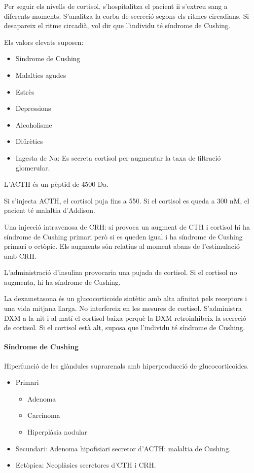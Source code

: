 Per seguir els nivells de cortisol, s'hospitalitza el pacient ii
s'extreu sang a diferents moments. S'analitza la corba de secreció
segons els ritmes circadians. Si desapareix el ritme circadià, vol dir
que l'individu té síndrome de Cushing.

Els valors elevats suposen:
\begin{itemize}
\item Síndrome de Cushing
\item Malalties agudes
\item Estrès
\item Depressions
\item Alcoholisme
\item Diürètics
\item Ingesta de Na: Es secreta cortisol per augmentar la taxa de
  filtració glomerular.
\end{itemize}

L'ACTH és un pèptid de 4500 Da.

Si s'injecta ACTH, el cortisol puja fins a 550. Si el cortisol es
queda a 300 nM, el pacient té malaltia d'Addison.

Una injecció intravenosa de CRH: si provoca un augment de CTH i
cortisol hi ha síndrome de Cushing primari però si es queden igual i
ha síndrome de Cushing primari o ectòpic. Els augments són relatius al
moment abans de l'estimulació amb CRH.

L'administració d'insulina provocaria una pujada de cortisol. Si el
cortisol no augmenta, hi ha síndrome de Cushing.

La dexametasona és un glucocorticoide sintètic amb alta afinitat pels
receptors i una vida mitjana llarga. No interfereix en les mesures de
cortisol. S'administra DXM a la nit i al matí el cortisol baixa perquè
la DXM retroinhibeix la secreció de cortisol. Si el cortisol està alt,
suposa que l'individu té síndrome de Cushing.

\paragraph{Síndrome de Cushing}
Hiperfunció de les glàndules suprarenals amb hiperproducció de
glucocorticoides.
\begin{itemize}
\item Primari
  \begin{itemize}
  \item Adenoma
  \item Carcinoma
  \item Hiperplàsia nodular
  \end{itemize}
\item Secundari: Adenoma hipofisiari secretor d'ACTH: malaltia de
  Cushing.
  
\item Ectòpica: Neoplàsies secretores d'CTH i CRH.
\end{itemize}

